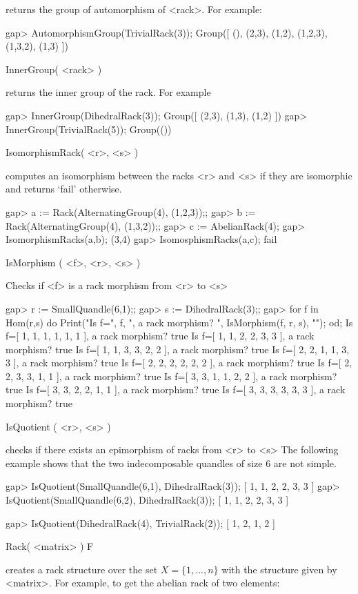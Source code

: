 returns the group of automorphism of <rack>. For example:

\beginexample
gap> AutomorphismGroup(TrivialRack(3));                  
Group([ (), (2,3), (1,2), (1,2,3), (1,3,2), (1,3) ])
\endexample

\>InnerGroup( <rack> )

returns the inner group of the rack. For example

\beginexample
gap> InnerGroup(DihedralRack(3));
Group([ (2,3), (1,3), (1,2) ])
gap> InnerGroup(TrivialRack(5)); 
Group(())
\endexample

\>IsomorphismRack( <r>, <s> )

computes  an  isomorphism  between  the  racks  <r>  and  <s> if they are
isomorphic and returns `fail' otherwise.

\beginexample
gap> a := Rack(AlternatingGroup(4), (1,2,3));;
gap> b := Rack(AlternatingGroup(4), (1,3,2));;
gap> c := AbelianRack(4);
gap> IsomorphismRacks(a,b);
(3,4)
gap> IsomosphismRacks(a,c);
fail
\endexample

\>IsMorphism ( <f>, <r>, <s> )

Checks if <f> is a rack morphism from <r> to <s>

\beginexample
gap> r := SmallQuandle(6,1);;
gap> s := DihedralRack(3);;
gap> for f in Hom(r,s) do Print("Is f=", f, ", a rack morphism? ", IsMorphism(f, r, s), "\n"); od;
Is f=[ 1, 1, 1, 1, 1, 1 ], a rack morphism? true
Is f=[ 1, 1, 2, 2, 3, 3 ], a rack morphism? true
Is f=[ 1, 1, 3, 3, 2, 2 ], a rack morphism? true
Is f=[ 2, 2, 1, 1, 3, 3 ], a rack morphism? true
Is f=[ 2, 2, 2, 2, 2, 2 ], a rack morphism? true
Is f=[ 2, 2, 3, 3, 1, 1 ], a rack morphism? true
Is f=[ 3, 3, 1, 1, 2, 2 ], a rack morphism? true
Is f=[ 3, 3, 2, 2, 1, 1 ], a rack morphism? true
Is f=[ 3, 3, 3, 3, 3, 3 ], a rack morphism? true
\endexample

\>IsQuotient ( <r>, <s> )

checks if there exists an epimorphism of racks from <r> to <s> The following
example shows that the two indecomposable quandles of size 6 are not simple.

\beginexample
gap> IsQuotient(SmallQuandle(6,1), DihedralRack(3));
[ 1, 1, 2, 2, 3, 3 ]
gap> IsQuotient(SmallQuandle(6,2), DihedralRack(3));
[ 1, 1, 2, 2, 3, 3 ]
\endexample

\beginexample
gap> IsQuotient(DihedralRack(4), TrivialRack(2));
[ 1, 2, 1, 2 ]
\endexample

\>Rack( <matrix> ) F

creates a rack structure over the set $X=\{1,...,n\}$ with the structure 
given by <matrix>. For example, to get the abelian rack of two elements:


